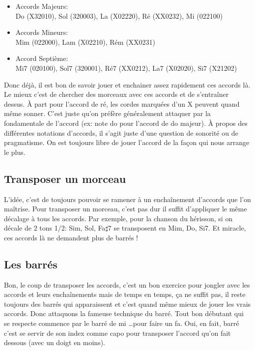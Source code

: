 \documentclass[a4paper]{article}
\begin{document}
\begin{itemize}
\item Accords Majeurs:\\ 
  Do (X32010), Sol (320003), La (X02220), Ré (XX0232), Mi (022100)\\
\item Accords Mineurs:\\
  Mim (022000), Lam (X02210), Rém (XX0231)\\
\item Accord Septième:\\
  Mi7 (020100), Sol7 (320001), Ré7 (XX0212), La7 (X02020), Si7 (X21202)\\
\end{itemize}

Donc déjà, il est bon de savoir jouer et enchainer assez rapidement
ces accords là. Le mieux c'est de chercher des morceaux avec ces
accords et de s'entraîner dessus.  À part pour l'accord de ré, les
cordes marquées d'un X peuvent quand même sonner.  C'est juste qu'on
préfère généralement attaquer par la fondamentale de l'accord (ex:
note do pour l'accord de do majeur).  À propos des différentes
notations d'accords, il s'agit juste d'une question de sonorité ou de
pragmatisme. On est toujours libre de jouer l'accord de la façon qui
nous arrange le plus.

\subsection{Transposer un morceau}

L'idée, c'est de toujours pouvoir se ramener à un enchaînement
d'accords que l'on maîtrise.  Pour transposer un morceau, c'est pas
dur il suffit d'appliquer le même décalage à tous les accords.  Par
exemple, pour la chanson du hérisson, si on décale de 2 tons 1/2: Sim,
Sol, Fa$\sharp$7 se transposent en Mim, Do, Si7.  Et miracle, ces
accords là ne demandent plus de barrés !

\subsection{Les barrés}

Bon, le coup de transposer les accords, c'est un bon exercice pour
jongler avec les accords et leurs enchaînements mais de temps en
temps, ça ne suffit pas, il reste toujours des barrés qui apparaissent
et c'est quand même mieux de jouer les vrais accords. Donc attaquons
la fameuse technique du barré. Tout bon débutant qui se respecte
commence par le barré de mi \dots pour faire un fa. Oui, en fait,
barré c'est se servir de son index comme capo pour transposer l'accord
qu'on fait dessous (avec un doigt en moins).
\end{document}
